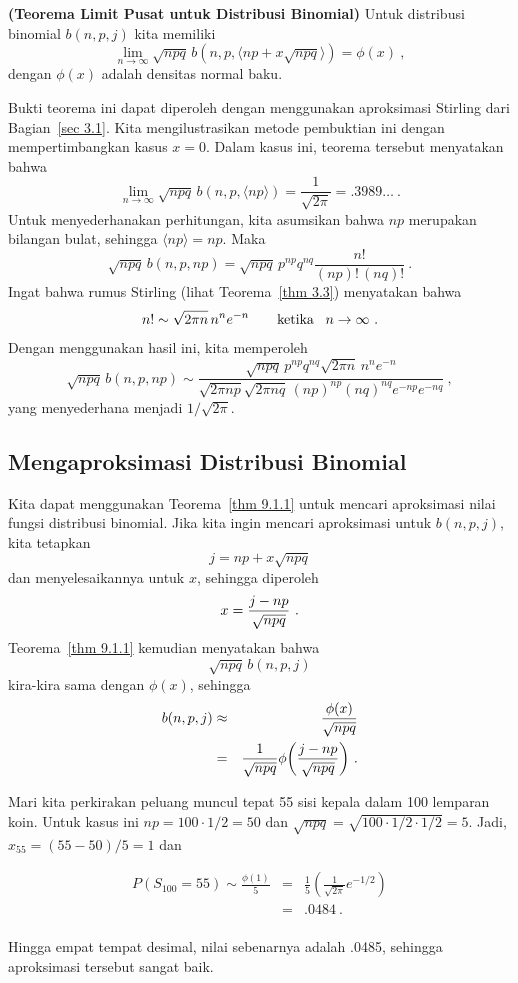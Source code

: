\begin{theorem}{\bf (Teorema Limit Pusat untuk Distribusi Binomial)}\label{thm
9.1.1}
Untuk distribusi binomial $b(n,p,j)$ kita memiliki
$$
\lim_{n \to \infty} \sqrt{npq}\,b(n,p,\langle np + x\sqrt{npq} \rangle) = \phi(x)\ ,
$$
dengan $\phi(x)$ adalah densitas normal baku.
\par
Bukti teorema ini dapat diperoleh dengan menggunakan aproksimasi Stirling dari
Bagian~\ref{sec 3.1}.  Kita mengilustrasikan metode pembuktian ini dengan mempertimbangkan
kasus $x = 0$.  Dalam kasus ini, teorema tersebut menyatakan bahwa
$$
\lim_{n \to \infty} \sqrt{npq}\,b(n,p,\langle np \rangle) = \frac 1{\sqrt{2\pi}}
= .3989\ldots\ .
$$
Untuk menyederhanakan perhitungan, kita asumsikan bahwa $np$ merupakan bilangan bulat, sehingga
$\langle np \rangle = np$.  Maka
$$
\sqrt{npq}\,b(n,p,np) = \sqrt{npq}\,p^{np}q^{nq} \frac {n!}{(np)!\,(nq)!}\ .
$$
Ingat bahwa rumus Stirling (lihat Teorema~\ref{thm 3.3}) menyatakan bahwa
$$
n! \sim \sqrt{2\pi n}\,n^n e^{-n} \qquad \mbox {ketika \,\,\,} n \to \infty\ .
$$
Dengan menggunakan hasil ini, kita memperoleh
$$
\sqrt{npq}\,b(n,p,np) \sim \frac {\sqrt{npq}\,p^{np}q^{nq} \sqrt{2\pi n}\,n^n
e^{-n}}{\sqrt{2\pi np} \sqrt{2\pi nq}\,(np)^{np} (nq)^{nq} e^{-np} e^{-nq}}\ ,
$$
yang menyederhana menjadi $1/\sqrt{2\pi}$.
\end{theorem}
\subsection*{Mengaproksimasi Distribusi Binomial}
Kita dapat menggunakan Teorema~\ref{thm 9.1.1} untuk mencari aproksimasi nilai fungsi
distribusi binomial.  Jika kita ingin mencari aproksimasi untuk $b(n, p, j)$, kita tetapkan
$$j = np + x\sqrt{npq}$$
dan menyelesaikannya untuk $x$, sehingga diperoleh
$$x = {{j-np}\over{\sqrt{npq}}}\ .$$
Teorema~\ref{thm 9.1.1} kemudian menyatakan bahwa 
$$\sqrt{npq}\,b(n,p,j)$$
kira-kira sama dengan $\phi(x)$, sehingga
\begin{eqnarray*}
b(n,p,j) &\approx& {{\phi(x)}\over{\sqrt{npq}}}\\
&=& {1\over{\sqrt{npq}}} \phi\biggl({{j-np}\over{\sqrt{npq}}}\biggr)\ .\\
\end{eqnarray*}


\begin{example}\label{exam 9.1}
Mari kita perkirakan peluang muncul tepat 55 sisi kepala dalam 100 lemparan koin. 
Untuk kasus ini $np = 100 \cdot 1/2 = 50$ dan $\sqrt{npq} = \sqrt{100 \cdot 1/2
\cdot 1/2} = 5$.  Jadi, $x_{55} = (55 - 50)/5 = 1$ dan

\begin{eqnarray*}
P(S_{100} = 55) \sim \frac {\phi(1)}5 &=& \frac 15 \left( \frac 1{\sqrt{2\pi}}e^{-1/2} \right) \\
                                   &=& .0484\ . \\
\end{eqnarray*}

Hingga empat tempat desimal, nilai sebenarnya adalah .0485, sehingga
aproksimasi tersebut sangat baik.
\end{example}

